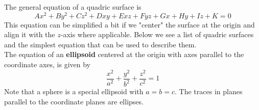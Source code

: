 \documentclass[handout]{ximera}
\begin{document}
\begin{image}
\end{image}


\begin{image}
\end{image}

\begin{image}
\end{image}


The general equation of a quadric surface is 
\[
Ax^2 + By^2 + Cz^2 + Dxy + Exz + Fyz + Gx + Hy + Iz + K = 0
\]
This equation can be simplified a bit if we "center" the surface at the origin and 
align it with the $z$-axis where applicable. 
Below we see a list of quadric surfaces and the simplest equation that can be used to describe them.\\

The equation of an \textbf{ellipsoid} centered at the origin with axes parallel to the coordinate axes, is given by 
\[
\frac{x^2}{a^2} + \frac{y^2}{b^2}+ \frac{z^2}{c^2} = 1
\]
Note that a sphere is a special ellipsoid with $ a=b=c$.
The traces in planes parallel to the coordinate planes are ellipses.


\end{document}
